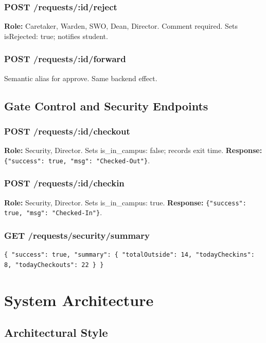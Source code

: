 \documentclass[12pt,a4paper]{report}
\newcommand{\code}[1]{\texttt{#1}}
\begin{document}
\subsection{POST /requests/:id/reject}
\textbf{Role:} Caretaker, Warden, SWO, Dean, Director. Comment required. Sets isRejected: true; notifies student.

\subsection{POST /requests/:id/forward} Semantic alias for approve. Same backend effect.

\section{Gate Control and Security Endpoints}

\subsection{POST /requests/:id/checkout} \textbf{Role:} Security, Director. Sets is\_in\_campus: false; records exit time. \textbf{Response:} \code{\{"success": true, "msg": "Checked-Out"\}}.

\subsection{POST /requests/:id/checkin} \textbf{Role:} Security, Director. Sets is\_in\_campus: true. \textbf{Response:} \code{\{"success": true, "msg": "Checked-In"\}}.

\subsection{GET /requests/security/summary}
\begin{lstlisting}[caption={Security summary},label={lst:secsummary}]
{ "success": true, "summary": { "totalOutside": 14, "todayCheckins": 8, "todayCheckouts": 22 } }
\end{lstlisting}

\chapter{System Architecture}

\section{Architectural Style}
\end{document}
